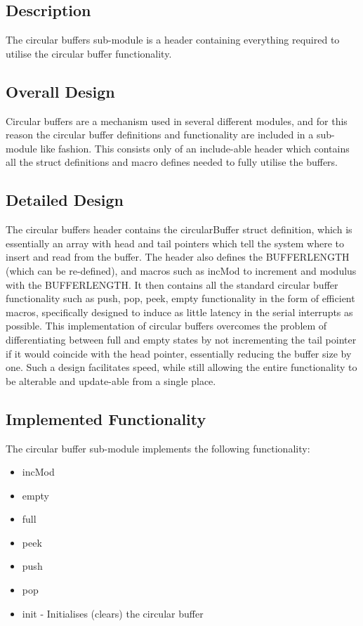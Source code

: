 \documentclass[]{report}
\begin{document}
\subsection{Description}
The circular buffers sub-module is a header containing everything required to utilise the circular buffer functionality.

\subsection{Overall Design}
Circular buffers are a mechanism used in several different modules, and for this reason the circular buffer definitions and functionality are included in a sub-module like fashion. This consists only of an include-able header which contains all the struct definitions and macro defines needed to fully utilise the buffers.

\subsection{Detailed Design}
The circular buffers header contains the circularBuffer struct definition, which is essentially an array with head and tail pointers which tell the system where to insert and read from the buffer. The header also defines the BUFFERLENGTH (which can be re-defined), and macros such as incMod to increment and modulus with the BUFFERLENGTH. It then contains all the standard circular buffer functionality such as push, pop, peek, empty functionality in the form of efficient macros, specifically designed to induce as little latency in the serial interrupts as possible. \newline
This implementation of circular buffers overcomes the problem of differentiating between full and empty states by not incrementing the tail pointer if it would coincide with the head pointer, essentially reducing the buffer size by one. \newline
Such a design facilitates speed, while still allowing the entire functionality to be alterable and update-able from a single place.

\subsection{Implemented Functionality}
The circular buffer sub-module implements the following functionality:
\begin{itemize}
	\item incMod
	\item empty
	\item full
	\item peek
	\item push
	\item pop
	\item init - Initialises (clears) the circular buffer
\end{itemize}
\end{document}
